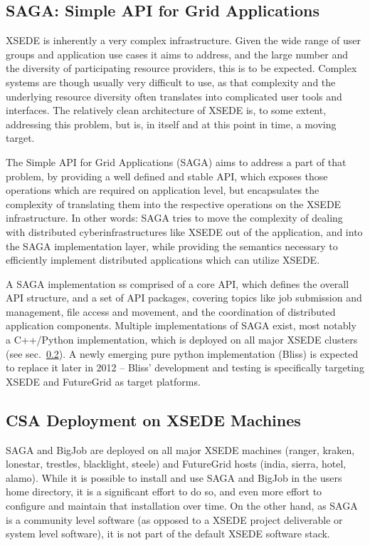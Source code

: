 \documentclass{sig-alternate}
\begin{document}
\subsection{SAGA: Simple API for Grid Applications}
 \label{ssec:saga}

XSEDE is inherently a very complex infrastructure.  Given the wide
range of user groups and application use cases it aims to address,
and the large number and the diversity of participating resource
providers, this is to be expected.  Complex systems are though
usually very difficult to use, as that complexity and the underlying
resource diversity often translates into complicated user tools and
interfaces.  The relatively clean architecture of XSEDE is, to some
extent, addressing this problem, but is, in itself and at this point
in time, a moving target.

The Simple API for Grid Applications (SAGA) aims to address a part of
that problem, by providing a well defined and stable API, which
exposes those operations which are required on application level, but
encapsulates the complexity of translating them into the respective
operations on the XSEDE infrastructure.  In other words: SAGA tries
to move the complexity of dealing with distributed
cyberinfrastructures like XSEDE out of the application, and into the
SAGA implementation layer, while providing the semantics necessary to
efficiently implement distributed applications which can utilize
XSEDE.

A SAGA implementation ss comprised of a
core API, which defines the overall API structure, and a set of API
packages, covering topics like job submission and management, file
access and movement, and the coordination of distributed application
components.  Multiple implementations of SAGA exist, most notably a
C++/Python implementation, which is deployed on all major XSEDE
clusters (see sec.~\ref{ssec:csa}).  A newly emerging pure python
implementation (Bliss) is expected to replace it later in 2012 --
Bliss' development and testing is specifically targeting XSEDE and
FutureGrid as target platforms.

\subsection{CSA Deployment on XSEDE Machines}
 \label{ssec:csa}

 SAGA and BigJob are deployed on all major XSEDE machines (ranger,
 kraken, lonestar, trestles, blacklight, steele) and FutureGrid hosts
 (india, sierra, hotel, alamo).  While it is possible to install and
 use SAGA and BigJob in the users home directory, it is a significant
 effort to do so, and even more effort to configure and maintain that
 installation over time. On the other hand, as SAGA is a community
 level software (as opposed to a XSEDE project deliverable or system
 level software), it is not part of the default XSEDE software stack.
\end{document}
